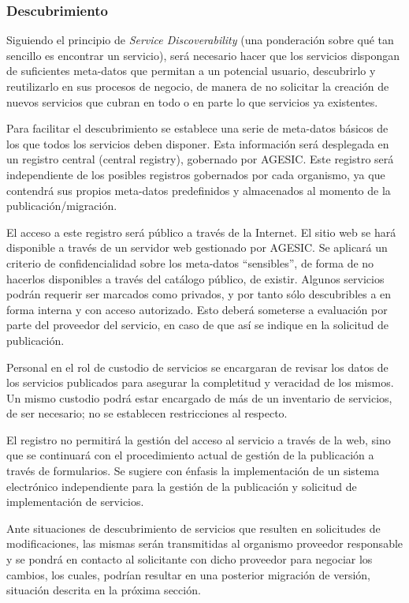 \documentclass[11pt]{article}
\begin{document}
			\subsubsection{Descubrimiento}
				Siguiendo el principio de \emph{Service Discoverability} (una ponderación sobre qué tan sencillo es encontrar un servicio), será necesario hacer que los servicios dispongan de suficientes meta-datos que permitan a un potencial usuario, descubrirlo y reutilizarlo en sus procesos de negocio, de manera de no solicitar la creación de nuevos servicios que cubran en todo o en parte lo que servicios ya existentes.

				Para facilitar el descubrimiento se establece una serie de meta-datos básicos de los que todos los servicios deben disponer. Esta información será desplegada en un registro central (central registry), gobernado por AGESIC. Este registro será independiente de los posibles registros gobernados por cada organismo, ya que contendrá sus propios meta-datos predefinidos y almacenados al momento de la publicación/migración.

				El acceso a este registro será público a través de la Internet. El sitio web se hará disponible a través de un servidor web gestionado por AGESIC. Se aplicará un criterio de confidencialidad sobre los meta-datos “sensibles”, de forma de no hacerlos disponibles a través del catálogo público, de existir.
				Algunos servicios podrán requerir ser marcados como privados, y por tanto sólo descubribles a en forma interna y con acceso autorizado. Esto deberá someterse a evaluación por parte del proveedor del servicio, en caso de que así se indique en la solicitud de publicación.

				Personal en el rol de custodio de servicios se encargaran de revisar los datos de los servicios publicados para asegurar la completitud y veracidad de los mismos. Un mismo custodio podrá estar encargado de más de un inventario de servicios, de ser necesario; no se establecen restricciones al respecto.

				El registro no permitirá la gestión del acceso al servicio a través de la web, sino que se continuará con el procedimiento actual de gestión de la publicación a través de formularios. Se sugiere con énfasis la implementación de un sistema electrónico independiente para la gestión de la publicación y solicitud de implementación de servicios.

				Ante situaciones de descubrimiento de servicios que resulten en solicitudes de modificaciones, las mismas serán transmitidas al organismo proveedor responsable y se pondrá en contacto al solicitante con dicho proveedor para negociar los cambios, los cuales, podrían resultar en una posterior migración de versión, situación descrita en la próxima sección.
\end{document}
